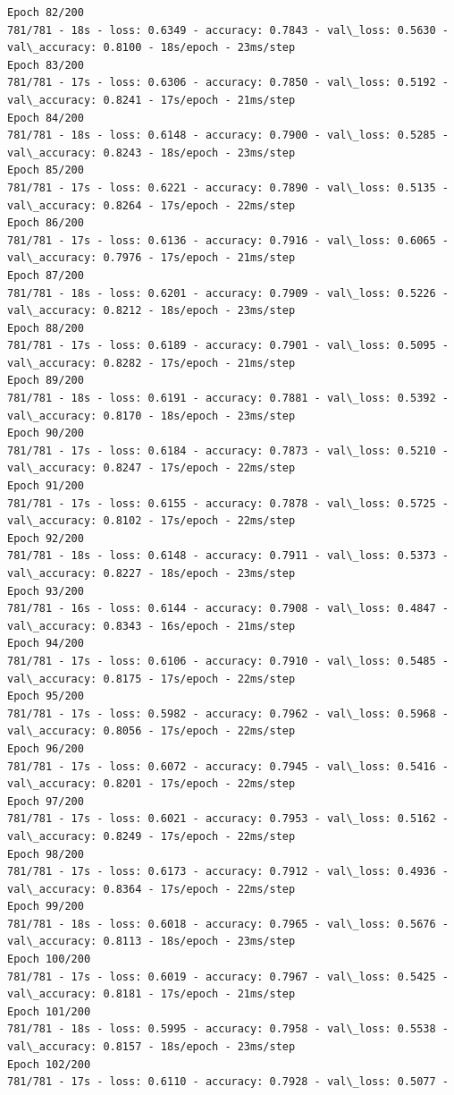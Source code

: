 \documentclass[11pt]{article}
\begin{document}
\begin{Verbatim}[commandchars=\\\{\}]
Epoch 82/200
781/781 - 18s - loss: 0.6349 - accuracy: 0.7843 - val\_loss: 0.5630 -
val\_accuracy: 0.8100 - 18s/epoch - 23ms/step
Epoch 83/200
781/781 - 17s - loss: 0.6306 - accuracy: 0.7850 - val\_loss: 0.5192 -
val\_accuracy: 0.8241 - 17s/epoch - 21ms/step
Epoch 84/200
781/781 - 18s - loss: 0.6148 - accuracy: 0.7900 - val\_loss: 0.5285 -
val\_accuracy: 0.8243 - 18s/epoch - 23ms/step
Epoch 85/200
781/781 - 17s - loss: 0.6221 - accuracy: 0.7890 - val\_loss: 0.5135 -
val\_accuracy: 0.8264 - 17s/epoch - 22ms/step
Epoch 86/200
781/781 - 17s - loss: 0.6136 - accuracy: 0.7916 - val\_loss: 0.6065 -
val\_accuracy: 0.7976 - 17s/epoch - 21ms/step
Epoch 87/200
781/781 - 18s - loss: 0.6201 - accuracy: 0.7909 - val\_loss: 0.5226 -
val\_accuracy: 0.8212 - 18s/epoch - 23ms/step
Epoch 88/200
781/781 - 17s - loss: 0.6189 - accuracy: 0.7901 - val\_loss: 0.5095 -
val\_accuracy: 0.8282 - 17s/epoch - 21ms/step
Epoch 89/200
781/781 - 18s - loss: 0.6191 - accuracy: 0.7881 - val\_loss: 0.5392 -
val\_accuracy: 0.8170 - 18s/epoch - 23ms/step
Epoch 90/200
781/781 - 17s - loss: 0.6184 - accuracy: 0.7873 - val\_loss: 0.5210 -
val\_accuracy: 0.8247 - 17s/epoch - 22ms/step
Epoch 91/200
781/781 - 17s - loss: 0.6155 - accuracy: 0.7878 - val\_loss: 0.5725 -
val\_accuracy: 0.8102 - 17s/epoch - 22ms/step
Epoch 92/200
781/781 - 18s - loss: 0.6148 - accuracy: 0.7911 - val\_loss: 0.5373 -
val\_accuracy: 0.8227 - 18s/epoch - 23ms/step
Epoch 93/200
781/781 - 16s - loss: 0.6144 - accuracy: 0.7908 - val\_loss: 0.4847 -
val\_accuracy: 0.8343 - 16s/epoch - 21ms/step
Epoch 94/200
781/781 - 17s - loss: 0.6106 - accuracy: 0.7910 - val\_loss: 0.5485 -
val\_accuracy: 0.8175 - 17s/epoch - 22ms/step
Epoch 95/200
781/781 - 17s - loss: 0.5982 - accuracy: 0.7962 - val\_loss: 0.5968 -
val\_accuracy: 0.8056 - 17s/epoch - 22ms/step
Epoch 96/200
781/781 - 17s - loss: 0.6072 - accuracy: 0.7945 - val\_loss: 0.5416 -
val\_accuracy: 0.8201 - 17s/epoch - 22ms/step
Epoch 97/200
781/781 - 17s - loss: 0.6021 - accuracy: 0.7953 - val\_loss: 0.5162 -
val\_accuracy: 0.8249 - 17s/epoch - 22ms/step
Epoch 98/200
781/781 - 17s - loss: 0.6173 - accuracy: 0.7912 - val\_loss: 0.4936 -
val\_accuracy: 0.8364 - 17s/epoch - 22ms/step
Epoch 99/200
781/781 - 18s - loss: 0.6018 - accuracy: 0.7965 - val\_loss: 0.5676 -
val\_accuracy: 0.8113 - 18s/epoch - 23ms/step
Epoch 100/200
781/781 - 17s - loss: 0.6019 - accuracy: 0.7967 - val\_loss: 0.5425 -
val\_accuracy: 0.8181 - 17s/epoch - 21ms/step
Epoch 101/200
781/781 - 18s - loss: 0.5995 - accuracy: 0.7958 - val\_loss: 0.5538 -
val\_accuracy: 0.8157 - 18s/epoch - 23ms/step
Epoch 102/200
781/781 - 17s - loss: 0.6110 - accuracy: 0.7928 - val\_loss: 0.5077 -

\end{Verbatim}
\end{document}
